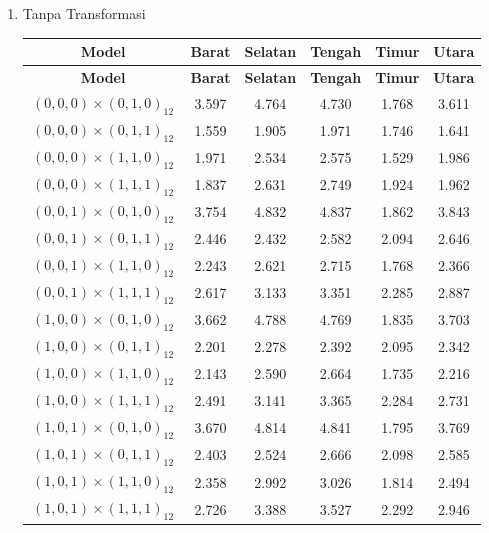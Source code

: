 \begin{enumerate}[label=\alph*.]
    \item Tanpa Transformasi
        \begin{longtable}{|c|c|c|c|c|c|}
        \hline
        \textbf{Model} & \textbf{Barat} & \textbf{Selatan} & \textbf{Tengah} & \textbf{Timur} & \textbf{Utara} \\
        \hline
        \endfirsthead

        \hline
        \textbf{Model} & \textbf{Barat} & \textbf{Selatan} & \textbf{Tengah} & \textbf{Timur} & \textbf{Utara} \\
        \hline
        \endhead

        \hline
        \endfoot

        \hline
        \endlastfoot

        $\,(0,0,0)\times(0,1,0)_{12}\,$ & 3.597 & 4.764 & 4.730 & 1.768 & 3.611 \\ \hline
        $\,(0,0,0)\times(0,1,1)_{12}\,$ & 1.559 & 1.905 & 1.971 & 1.746 & 1.641 \\ \hline
        $\,(0,0,0)\times(1,1,0)_{12}\,$ & 1.971 & 2.534 & 2.575 & 1.529 & 1.986 \\ \hline
        $\,(0,0,0)\times(1,1,1)_{12}\,$ & 1.837 & 2.631 & 2.749 & 1.924 & 1.962 \\ \hline

        $\,(0,0,1)\times(0,1,0)_{12}\,$ & 3.754 & 4.832 & 4.837 & 1.862 & 3.843 \\ \hline
        $\,(0,0,1)\times(0,1,1)_{12}\,$ & 2.446 & 2.432 & 2.582 & 2.094 & 2.646 \\ \hline
        $\,(0,0,1)\times(1,1,0)_{12}\,$ & 2.243 & 2.621 & 2.715 & 1.768 & 2.366 \\ \hline
        $\,(0,0,1)\times(1,1,1)_{12}\,$ & 2.617 & 3.133 & 3.351 & 2.285 & 2.887 \\ \hline

        $\,(1,0,0)\times(0,1,0)_{12}\,$ & 3.662 & 4.788 & 4.769 & 1.835 & 3.703 \\ \hline
        $\,(1,0,0)\times(0,1,1)_{12}\,$ & 2.201 & 2.278 & 2.392 & 2.095 & 2.342 \\ \hline
        $\,(1,0,0)\times(1,1,0)_{12}\,$ & 2.143 & 2.590 & 2.664 & 1.735 & 2.216 \\ \hline
        $\,(1,0,0)\times(1,1,1)_{12}\,$ & 2.491 & 3.141 & 3.365 & 2.284 & 2.731 \\ \hline

        $\,(1,0,1)\times(0,1,0)_{12}\,$ & 3.670 & 4.814 & 4.841 & 1.795 & 3.769 \\ \hline
        $\,(1,0,1)\times(0,1,1)_{12}\,$ & 2.403 & 2.524 & 2.666 & 2.098 & 2.585 \\ \hline
        $\,(1,0,1)\times(1,1,0)_{12}\,$ & 2.358 & 2.992 & 3.026 & 1.814 & 2.494 \\ \hline
        $\,(1,0,1)\times(1,1,1)_{12}\,$ & 2.726 & 3.388 & 3.527 & 2.292 & 2.946 \\ \hline


\end{longtable}
\end{enumerate}
